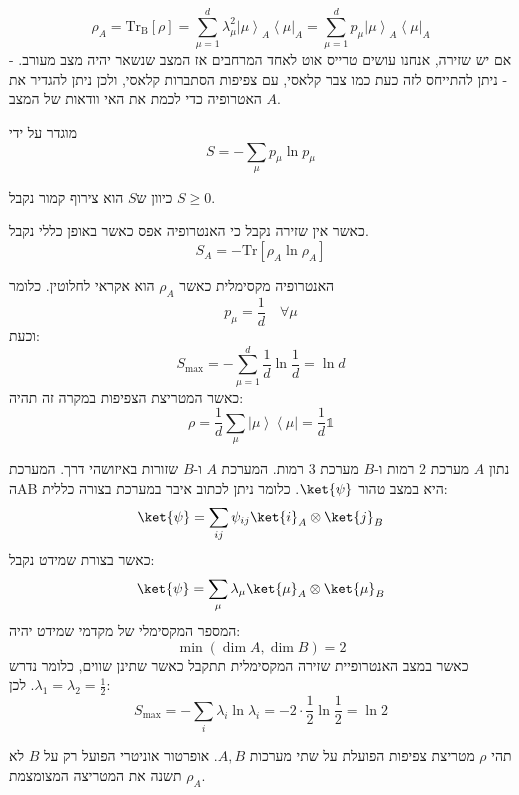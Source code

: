 \documentclass{tstextbook}
\begin{document}
\begin{proposition}
$$\rho_{A}=\mathrm{Tr_{B}}\left[\rho\right]=\sum_{\mu=1}^{d}\lambda_{\mu}^{2}\left|\mu\right\rangle_{A}\left\langle\mu\right|_{A}=\sum_{\mu=1}^{d}p_{\mu}\left|\mu\right\rangle_{A}\left\langle\mu\right|_{A}$$
- אם יש שזירה, אנחנו עושים טרייס אוט לאחד המרחבים אז המצב שנשאר יהיה מצב מעורב.
- ניתן להתייחס לזה כעת כמו צבר קלאסי, עם צפיפות הסתברות קלאסי, ולכן ניתן להגדיר את האטרופיה כדי לכמת את האי וודאות של המצב \(A\).

\end{proposition}
\begin{definition}
מוגדר על ידי
$$S=-\sum_{\mu}p_{\mu}\ln p_{\mu}$$

\end{definition}
\begin{remark}
כיוון ש\(S\) הוא צירוף קמור נקבל \(S\geq 0\).

\end{remark}
\begin{proposition}
כאשר אין שזירה נקבל כי האנטרופיה אפס כאשר באופן כללי נקבל.
$$S_{A}=-\mathrm{Tr}\left[\rho_{A}\ln\rho_{A}\right]$$

\end{proposition}
\begin{proposition}
האנטרופיה מקסימלית כאשר \(\rho_{A}\) הוא אקראי לחלוטין. כלומר
$$p_{\mu}=\frac{1}{d}\quad\forall\mu$$
וכעת:
$$S_{\mathrm{max}}=-\sum_{\mu=1}^{d}{\frac{1}{d}}\ln{\frac{1}{d}}=\ln d$$
כאשר המטריצת הצפיפות במקרה זה תהיה:
$$\rho=\frac{1}{d}\sum_{\mu}\left|\mu\right\rangle\left\langle\mu\right|=\frac{1}{d}\mathbb{1}$$

\end{proposition}
\begin{example}
נתון \(A\) מערכת 2 רמות ו-\(B\) מערכת 3 רמות. המערכת \(A\) ו-\(B\) שזורות באיזושהי דרך. המערכת הAB היא במצב טהור \(\ket{\psi}\). כלומר ניתן לכתוב איבר במערכת בצורה כללית:
$$\ket{\psi} =\sum_{ij}\psi_{ij}\ket{i} _{A}\otimes \ket{j} _{B}$$
כאשר בצורת שמידט נקבל:
$$\ket{\psi} = \sum_{\mu}\lambda_{\mu}\ket{\mu} _{A}\otimes \ket{\mu} _{B}$$
המספר המקסימלי של מקדמי שמידט יהיה:
$$\min \left( \dim A,\dim B \right)=2$$
כאשר במצב האנטרופיית שזירה המקסימלית תתקבל כאשר שתינן שווים, כלומר נדרש \(\lambda_{1}=\lambda_{2}=\frac{1}{2}\). לכן:
$$S_{\max }=-\sum_{i}\lambda_{i}\ln \lambda_{i}= -2\cdot\frac{1}{2}\ln \frac{1}{2}=\ln 2$$

\end{example}
\begin{proposition}
תהי \(\rho\) מטריצת צפיפות הפועלת על שתי מערכות \(A,B\). אופרטור אוניטרי הפועל רק על \(B\) לא תשנה את המטריצה המצומצמת \(\rho _A\).

\end{proposition}
\end{document}
